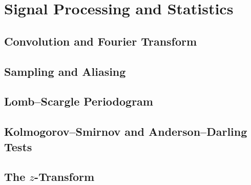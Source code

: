 \chapter{Signal Processing and Statistics}

\section{Convolution and Fourier Transform}
\TODO

\section{Sampling and Aliasing}
\TODO

\section{Lomb--Scargle Periodogram}
\TODO

\section{Kolmogorov--Smirnov and Anderson--Darling Tests}
\TODO

\section{The $z$-Transform}
\TODO
